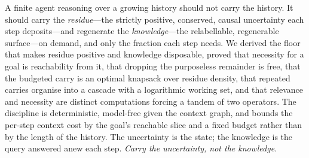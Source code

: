 \documentclass[11pt,a4paper]{article}
\theoremstyle{thmstyle}
\theoremstyle{definition}
\theoremstyle{remark}
\begin{document}
A finite agent reasoning over a growing history should not carry the history. It
should carry the \emph{residue}---the strictly positive, conserved, causal
uncertainty each step deposits---and regenerate the \emph{knowledge}---the
relabellable, regenerable surface---on demand, and only the fraction each step
needs. We derived the floor that makes residue positive and knowledge
disposable, proved that necessity for a goal is reachability from it, that
dropping the purposeless remainder is free, that the budgeted carry is an optimal
knapsack over residue density, that repeated carries organise into a cascade with
a logarithmic working set, and that relevance and necessity are distinct
computations forcing a tandem of two operators. The discipline is deterministic,
model-free given the context graph, and bounds the per-step context cost by the
goal's reachable slice and a fixed budget rather than by the length of the
history. The uncertainty is the state; the knowledge is the query answered anew
each step. \emph{Carry the uncertainty, not the knowledge.}



\end{document}
